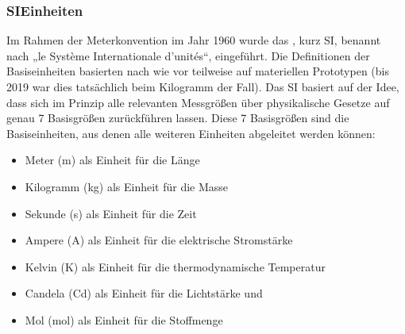 \documentclass[letterpaper,10pt,english]{jupyterBook}
\begin{document}
\subsubsection{SI\sphinxhyphen{}Einheiten}
\label{\detokenize{content/0_Basics:si-einheiten}}
\sphinxAtStartPar
Im Rahmen der Meterkonvention im Jahr 1960 wurde das , kurz SI, benannt nach „le Système Internationale d’unités“, eingeführt. Die Definitionen der Basiseinheiten basierten nach wie vor teilweise auf materiellen Prototypen (bis 2019 war dies tatsächlich beim Kilogramm der Fall). Das SI basiert auf der Idee, dass sich im Prinzip alle relevanten Messgrößen über physikalische Gesetze auf genau 7 Basisgrößen zurückführen lassen. Diese 7 Basisgrößen sind die Basiseinheiten, aus denen alle weiteren Einheiten abgeleitet werden können:
\begin{itemize}
\item {} 
\sphinxAtStartPar
Meter (m) als Einheit für die Länge

\item {} 
\sphinxAtStartPar
Kilogramm (kg) als Einheit für die Masse

\item {} 
\sphinxAtStartPar
Sekunde (s) als Einheit für die Zeit

\item {} 
\sphinxAtStartPar
Ampere (A) als Einheit für die elektrische Stromstärke

\item {} 
\sphinxAtStartPar
Kelvin (K) als Einheit für die thermodynamische Temperatur

\item {} 
\sphinxAtStartPar
Candela (Cd) als Einheit für die Lichtstärke und

\item {} 
\sphinxAtStartPar
Mol (mol) als Einheit für die Stoffmenge

\end{itemize}

\sphinxAtStartPar
{}
\end{document}
